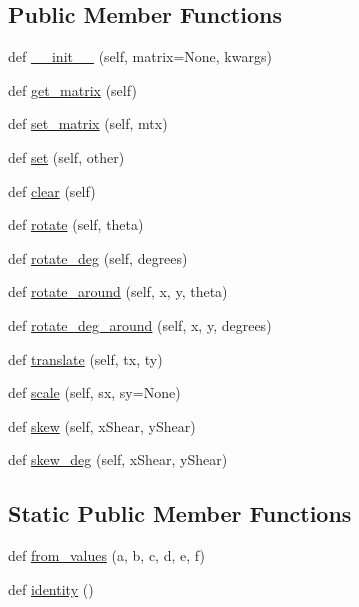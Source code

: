 \subsection*{Public Member Functions}
\begin{DoxyCompactItemize}
\item 
def \hyperlink{classmatplotlib_1_1transforms_1_1Affine2D_a2bd50b6320319e569e13a2b64d92758a}{\+\_\+\+\_\+init\+\_\+\+\_\+} (self, matrix=None, kwargs)
\item 
def \hyperlink{classmatplotlib_1_1transforms_1_1Affine2D_aeb3619ea042fff846005032dc8a338f8}{get\+\_\+matrix} (self)
\item 
def \hyperlink{classmatplotlib_1_1transforms_1_1Affine2D_ae2d2039dbe7b7f71f963012f686965e3}{set\+\_\+matrix} (self, mtx)
\item 
def \hyperlink{classmatplotlib_1_1transforms_1_1Affine2D_ae1754ccf9e53c616f1dd302d3d88de07}{set} (self, other)
\item 
def \hyperlink{classmatplotlib_1_1transforms_1_1Affine2D_afa6b95055417d3d465cc543a3a16ac4e}{clear} (self)
\item 
def \hyperlink{classmatplotlib_1_1transforms_1_1Affine2D_a93c783041609d16fa21604d34824d498}{rotate} (self, theta)
\item 
def \hyperlink{classmatplotlib_1_1transforms_1_1Affine2D_a923dd261e2b25d874a510d1c209ba51e}{rotate\+\_\+deg} (self, degrees)
\item 
def \hyperlink{classmatplotlib_1_1transforms_1_1Affine2D_a0e6c538c0e3dae6980c3ff2868a7ad42}{rotate\+\_\+around} (self, x, y, theta)
\item 
def \hyperlink{classmatplotlib_1_1transforms_1_1Affine2D_a924675f12ef956d1baca7cf870dc0e71}{rotate\+\_\+deg\+\_\+around} (self, x, y, degrees)
\item 
def \hyperlink{classmatplotlib_1_1transforms_1_1Affine2D_ac0bfbdad7634c5d9ef5c9e479652df39}{translate} (self, tx, ty)
\item 
def \hyperlink{classmatplotlib_1_1transforms_1_1Affine2D_ace725f95dffce8d38ca3ed69faca2d9a}{scale} (self, sx, sy=None)
\item 
def \hyperlink{classmatplotlib_1_1transforms_1_1Affine2D_a134418a94062c70adbc5ba5d56b21639}{skew} (self, x\+Shear, y\+Shear)
\item 
def \hyperlink{classmatplotlib_1_1transforms_1_1Affine2D_afd36d93b4fdbbcdf3b96f265ab6f85a0}{skew\+\_\+deg} (self, x\+Shear, y\+Shear)
\end{DoxyCompactItemize}
\subsection*{Static Public Member Functions}
\begin{DoxyCompactItemize}
\item 
def \hyperlink{classmatplotlib_1_1transforms_1_1Affine2D_a62a011b2660b72fa9df587d145b781c3}{from\+\_\+values} (a, b, c, d, e, f)
\item 
def \hyperlink{classmatplotlib_1_1transforms_1_1Affine2D_a648aabbd99acf62a85afde8f47d0e4b3}{identity} ()
\end{DoxyCompactItemize}
